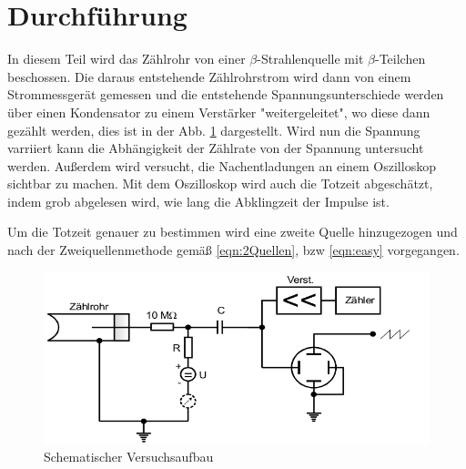 \section{Durchführung}
\label{sec:Durchführung}

In diesem Teil wird das Zählrohr von einer $\beta$-Strahlenquelle mit
$\beta$-Teilchen beschossen. Die daraus entstehende Zählrohrstrom wird dann von
einem Strommessgerät gemessen und die entstehende
Spannungsunterschiede werden über einen Kondensator zu einem Verstärker
"weitergeleitet", wo diese dann gezählt werden, dies ist in der
Abb. \ref{fig:VA} dargestellt.
Wird nun die Spannung varriiert kann die Abhängigkeit der Zählrate von der Spannung
untersucht werden. Außerdem wird versucht, die Nachentladungen an einem Oszilloskop
sichtbar zu machen. Mit dem Oszilloskop wird auch die Totzeit abgeschätzt, indem
grob abgelesen wird, wie lang die Abklingzeit der Impulse ist.

Um die Totzeit genauer zu bestimmen wird  eine zweite Quelle hinzugezogen und
nach der Zweiquellenmethode gemäß \eqref{eqn:2Quellen}, bzw \eqref{eqn:easy}
vorgegangen.

\begin{figure}
  \centering
  \includegraphics[height=5cm]{logos/Aufbau.png}
  \caption{Schematischer Versuchsaufbau}
  \label{fig:VA}
\end{figure}
